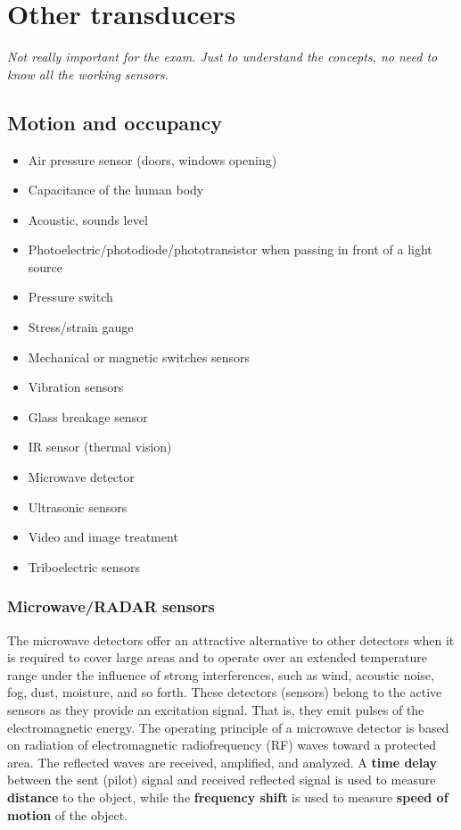 \section{Other transducers}

\textit{Not really important for the exam. Just to understand the concepts, no need to know all the working sensors.}

\subsection{Motion and occupancy}

\begin{itemize}
    \item Air pressure sensor (doors, windows opening)
    \item Capacitance of the human body
    \item Acoustic, sounds level
    \item Photoelectric/photodiode/phototransistor when passing in front of a light source
    \item Pressure switch
    \item Stress/strain gauge
    \item Mechanical or magnetic switches sensors
    \item Vibration sensors
    \item Glass breakage sensor
    \item IR sensor (thermal vision)
    \item Microwave detector
    \item Ultrasonic sensors
    \item Video and image treatment
    \item Triboelectric sensors
\end{itemize}

\subsubsection{Microwave/RADAR sensors}

The microwave detectors offer an attractive alternative to other detectors when it is
required to cover large areas and to operate over an extended temperature range under
the influence of strong interferences, such as wind, acoustic noise, fog, dust, moisture,
and so forth. These detectors (sensors) belong to the active sensors as they provide an
excitation signal. That is, they emit pulses of the electromagnetic energy. The
operating principle of a microwave detector is based on radiation of electromagnetic
radiofrequency (RF) waves toward a protected area. The reflected waves are received,
amplified, and analyzed. A \textbf{time delay} between the sent (pilot) signal and received
reflected signal is used to measure \textbf{distance} to the object, while the \textbf{frequency shift} is
used to measure \textbf{speed of motion} of the object.

